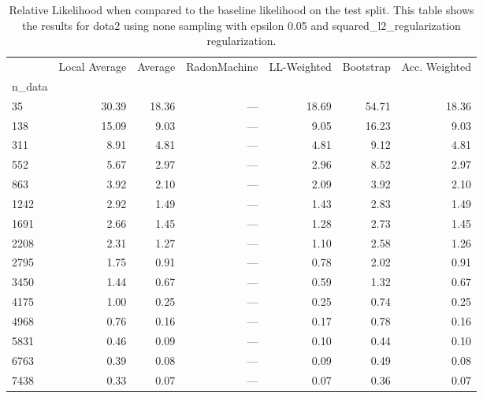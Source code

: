 \begin{table}
\centering
\caption{Relative Likelihood when compared to the baseline likelihood on the test split. This table shows the results for  dota2 using  none sampling with epsilon  0.05 and  squared_l2_regularization regularization.}
\label{tab:3}
\begin{tabular}{lrrrrrr}
\toprule
{} &  Local Average &  Average &  RadonMachine &  LL-Weighted &  Bootstrap &  Acc. Weighted \\
n\_data &                &          &               &              &            &                \\
\midrule
35     &          30.39 &    18.36 &           --- &        18.69 &      54.71 &          18.36 \\
138    &          15.09 &     9.03 &           --- &         9.05 &      16.23 &           9.03 \\
311    &           8.91 &     4.81 &           --- &         4.81 &       9.12 &           4.81 \\
552    &           5.67 &     2.97 &           --- &         2.96 &       8.52 &           2.97 \\
863    &           3.92 &     2.10 &           --- &         2.09 &       3.92 &           2.10 \\
1242   &           2.92 &     1.49 &           --- &         1.43 &       2.83 &           1.49 \\
1691   &           2.66 &     1.45 &           --- &         1.28 &       2.73 &           1.45 \\
2208   &           2.31 &     1.27 &           --- &         1.10 &       2.58 &           1.26 \\
2795   &           1.75 &     0.91 &           --- &         0.78 &       2.02 &           0.91 \\
3450   &           1.44 &     0.67 &           --- &         0.59 &       1.32 &           0.67 \\
4175   &           1.00 &     0.25 &           --- &         0.25 &       0.74 &           0.25 \\
4968   &           0.76 &     0.16 &           --- &         0.17 &       0.78 &           0.16 \\
5831   &           0.46 &     0.09 &           --- &         0.10 &       0.44 &           0.10 \\
6763   &           0.39 &     0.08 &           --- &         0.09 &       0.49 &           0.08 \\
7438   &           0.33 &     0.07 &           --- &         0.07 &       0.36 &           0.07 \\
\bottomrule
\end{tabular}
\end{table}
